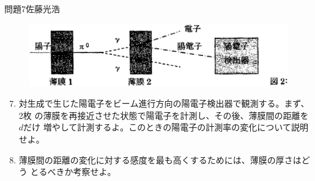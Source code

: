 \documentclass[fleqn]{jbook}
\begin{document}
\begin{question}{問題7}{佐藤光浩}
\begin{figure}[htbp]
  \begin{center}
    \includegraphics[width=150mm]{2003phy7-2.eps}
  \end{center}
\end{figure}

\begin{enumerate}\setcounter{enumi}{6}
\item
 対生成で生じた陽電子をビーム進行方向の陽電子検出器で観測する。まず、2枚
の薄膜を再接近させた状態で陽電子を計測し、その後、薄膜間の距離を$d$だけ
増やして計測するよ。このときの陽電子の計測率の変化について説明せよ。

\item 
 薄膜間の距離の変化に対する感度を最も高くするためには、薄膜の厚さはどう
とるべきか考察せよ。

\end{enumerate}
\end{question}
\end{document}
